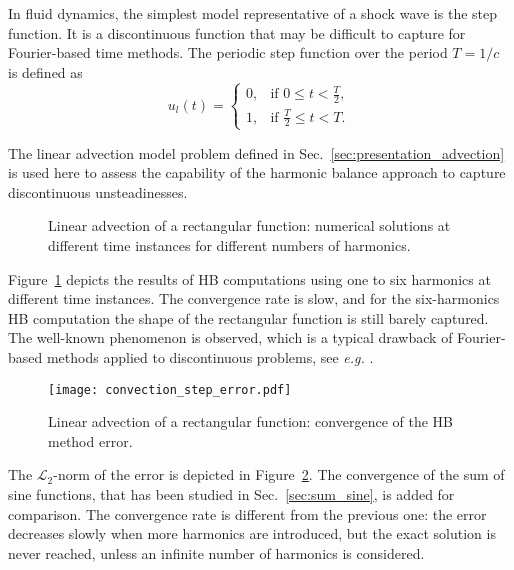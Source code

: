 
In fluid dynamics, the simplest model 
representative of a shock wave
is the step function. It is a discontinuous function
that may be difficult to capture for Fourier-based time methods.
The periodic step function over the period $T=1/c$ is defined as
\begin{equation}
    u_l(t) = 
    \begin{cases}
        0, & \text{if } 0 \leq t < \frac{T}{2}, \\
        1, & \text{if } \frac{T}{2} \leq t < T.
    \end{cases}
    \label{eq:inject_step}
\end{equation}

The linear advection model problem defined in 
Sec.~\ref{sec:presentation_advection} is used here to assess
the capability of the harmonic balance approach to capture
discontinuous unsteadinesses.

\begin{figure}[htp]
  \centering
  \caption{Linear advection of a rectangular function: 
  numerical solutions at different time instances for different numbers of harmonics.}
  \label{fig:inj_step_results}
\end{figure}
Figure~\ref{fig:inj_step_results} depicts the results of HB computations
using one to six harmonics at different time instances. The convergence rate 
is slow, and for the six-harmonics HB computation the
shape of the rectangular function is still barely captured. 
The well-known \citet{Gibbs1899}
phenomenon is observed, which is a typical drawback 
of Fourier-based methods applied to discontinuous problems, 
see \emph{e.g.} \citet{Canuto2006}.

\begin{figure}[htp]
  \centering
  \texttt{[image: convection\_step\_error.pdf]}
  \caption{Linear advection of a rectangular function: convergence of the HB method error.}
  \label{fig:conv_step}
\end{figure}
The $\mathcal{L}_2$-norm 
of the error is depicted in Figure~\ref{fig:conv_step}. 
The convergence of the sum of sine functions, 
that has been studied in Sec.~\ref{sec:sum_sine},
is added for comparison.
The convergence rate is different from the previous one: 
the error decreases slowly when more harmonics are introduced, 
but the exact solution is never reached, 
unless an infinite number of harmonics is considered.

